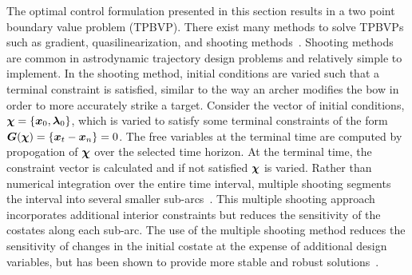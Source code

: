 \documentclass[smallcondensed]{svjour3}
\begin{document}
The optimal control formulation presented in this section results in a two point boundary value problem (TPBVP). 
There exist many methods to solve TPBVPs such as gradient, quasilinearization, and shooting methods~\cite{bryson1975,kirk2012}.
Shooting methods are common in astrodynamic trajectory design problems and relatively simple to implement.
In the shooting method, initial conditions are varied such that a terminal constraint is satisfied, similar to the way an archer modifies the bow in order to more accurately strike a target. 
Consider the vector of initial conditions, \( \bm{\chi} = \left\{ \bm{x}_0, \bm{\lambda}_0 \right\}\), which is varied to satisfy some terminal constraints of the form \( \bm{G}(\bm{\chi}) = \left\{ \bm{x}_t - \bm{x}_n \right\} = 0 \).
The free variables at the terminal time are computed by propogation of \( \bm{\chi} \) over the selected time horizon. 
At the terminal time, the constraint vector is calculated and if not satisfied \( \bm{\chi}\) is varied.
Rather than numerical integration over the entire time interval, multiple shooting segments the interval into several smaller sub-arcs~\cite{stoer2013}.
This multiple shooting approach incorporates additional interior constraints but reduces the sensitivity of the costates along each sub-arc.
The use of the multiple shooting method reduces the sensitivity of changes in the initial costate at the expense of additional design variables, but has been shown to provide more stable and robust solutions~\cite{ozimek2010a}.
\end{document}
